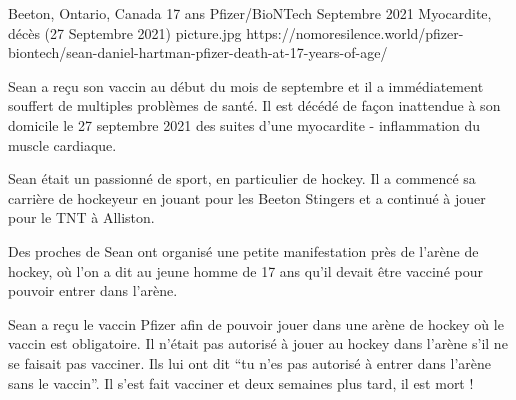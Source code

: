 {Beeton, Ontario, Canada}
{17 ans}
{Pfizer/BioNTech}
{Septembre 2021}
{Myocardite, décès (27 Septembre 2021)}
{picture.jpg}
{https://nomoresilence.world/pfizer-biontech/sean-daniel-hartman-pfizer-death-at-17-years-of-age/}
{

Sean a reçu son vaccin au début du mois de septembre et il a immédiatement
souffert de multiples problèmes de santé. Il est décédé de façon inattendue à
son domicile le 27 septembre 2021 des suites d'une myocardite - inflammation du
muscle cardiaque.

Sean était un passionné de sport, en particulier de hockey. Il a commencé sa
carrière de hockeyeur en jouant pour les Beeton Stingers et a continué à jouer
pour le TNT à Alliston.

Des proches de Sean ont organisé une petite manifestation près de l'arène de
hockey, où l'on a dit au jeune homme de 17 ans qu'il devait être vacciné pour
pouvoir entrer dans l'arène.

Sean a reçu le vaccin Pfizer afin de pouvoir jouer dans une arène de hockey où
le vaccin est obligatoire. Il n'était pas autorisé à jouer au hockey dans
l'arène s'il ne se faisait pas vacciner. Ils lui ont dit “tu n'es pas autorisé à
entrer dans l'arène sans le vaccin”. Il s'est fait vacciner et deux semaines
plus tard, il est mort !

}
